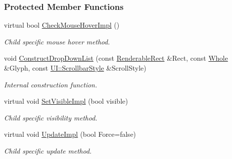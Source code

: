 \subsubsection*{Protected Member Functions}
\begin{DoxyCompactItemize}
\item 
\hypertarget{classMezzanine_1_1UI_1_1DropDownList_a4b11111a24d568251b37abef256ecce9}{
virtual bool \hyperlink{classMezzanine_1_1UI_1_1DropDownList_a4b11111a24d568251b37abef256ecce9}{CheckMouseHoverImpl} ()}
\label{classMezzanine_1_1UI_1_1DropDownList_a4b11111a24d568251b37abef256ecce9}

\begin{DoxyCompactList}\small\item\em Child specific mouse hover method. \item\end{DoxyCompactList}\item 
\hypertarget{classMezzanine_1_1UI_1_1DropDownList_a7ff7ebd9f7779e72dcba7c84870fc074}{
void \hyperlink{classMezzanine_1_1UI_1_1DropDownList_a7ff7ebd9f7779e72dcba7c84870fc074}{ConstructDropDownList} (const \hyperlink{structMezzanine_1_1UI_1_1RenderableRect}{RenderableRect} \&Rect, const \hyperlink{namespaceMezzanine_adcbb6ce6d1eb4379d109e51171e2e493}{Whole} \&Glyph, const \hyperlink{namespaceMezzanine_1_1UI_a5998a9bf372a7e92605c0c461736e763}{UI::ScrollbarStyle} \&ScrollStyle)}
\label{classMezzanine_1_1UI_1_1DropDownList_a7ff7ebd9f7779e72dcba7c84870fc074}

\begin{DoxyCompactList}\small\item\em Internal construction function. \item\end{DoxyCompactList}\item 
\hypertarget{classMezzanine_1_1UI_1_1DropDownList_a4987ac1e1b057ce320653ba01b70c468}{
virtual void \hyperlink{classMezzanine_1_1UI_1_1DropDownList_a4987ac1e1b057ce320653ba01b70c468}{SetVisibleImpl} (bool visible)}
\label{classMezzanine_1_1UI_1_1DropDownList_a4987ac1e1b057ce320653ba01b70c468}

\begin{DoxyCompactList}\small\item\em Child specific visibility method. \item\end{DoxyCompactList}\item 
\hypertarget{classMezzanine_1_1UI_1_1DropDownList_a85dbc074287079d020b89b7544f7967b}{
virtual void \hyperlink{classMezzanine_1_1UI_1_1DropDownList_a85dbc074287079d020b89b7544f7967b}{UpdateImpl} (bool Force=false)}
\label{classMezzanine_1_1UI_1_1DropDownList_a85dbc074287079d020b89b7544f7967b}

\begin{DoxyCompactList}\small\item\em Child specific update method. \item\end{DoxyCompactList}\end{DoxyCompactItemize}
